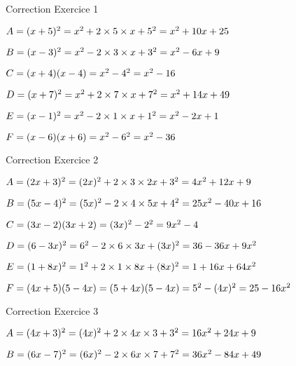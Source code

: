 
Correction Exercice 1

$A=(x+5)^2\\=x^2+2\times 5 \times x+5^2\\=x^2+10x+25$

$B=(x-3)^2\\=x^2-2\times 3\times x+3^2\\=x^2-6x+9$

$C=(x+4)(x-4)\\=x^2-4^2\\=x^2-16$

$D=(x+7)^2\\=x^2+2\times 7\times x+7^2\\=x^2+14x+49$

$E=(x-1)^2\\=x^2-2\times 1\times x+1^2\\=x^2-2x+1$

$F=(x-6)(x+6)\\=x^2-6^2\\=x^2-36$

Correction Exercice 2

$A=(2x+3)^2\\=(2x)^2+2\times 3\times 2x+3^2\\=4x^2+12x+9$

$B=(5x-4)^2\\=(5x)^2-2\times 4\times 5x+4^2\\=25x^2-40x+16$

$C=(3x-2)(3x+2)\\=(3x)^2-2^2\\=9x^2-4$

$D=(6-3x)^2\\=6^2-2\times 6\times 3x+(3x)^2\\=36-36x+9x^2$

$E=(1+8x)^2\\=1^2+2\times 1\times 8x+(8x)^2\\=1+16x+64x^2$

$F=(4x+5)(5-4x)\\=(5+4x)(5-4x)\\=5^2-(4x)^2\\=25-16x^2$

Correction Exercice 3

$ A=(4x+3)^2 \\
=(4x)^2+2\times 4x\times 3+3^2 \\
=16x^2+24x+9
$

$ B=(6x-7)^2 \\
=(6x)^2-2\times 6x \times 7 + 7^2 \\
=36x^2-84x+49
$

